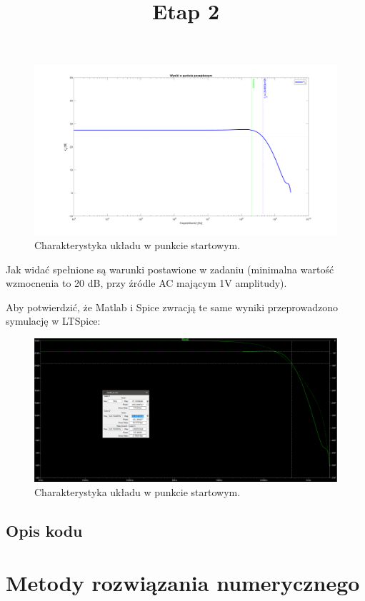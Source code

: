 \documentclass{article}
\begin{document}
\begin{figure}[h]
	\includegraphics[width=12cm]{graphics/starting_point.png}
	\centering
	\caption{Charakterystyka układu w punkcie startowym.}
\end{figure}

Jak widać spełnione są warunki postawione w zadaniu (minimalna wartość wzmocnenia to 20 dB, przy źródle AC mającym 1V amplitudy).
\pagebreak

Aby potwierdzić, że Matlab i Spice zwracją te same wyniki przeprowadzono symulację w LTSpice:
\begin{figure}[h]
	\includegraphics[width=12cm]{graphics/starting_point_spice.png}
	\centering
	\caption{Charakterystyka układu w punkcie startowym.}
\end{figure}

\subsection{Opis kodu}



\section{Metody rozwiązania numerycznego}

\pagebreak
\begin{center}
	\title{ \huge \textbf{Etap 2}}
\end{center}
\end{document}
